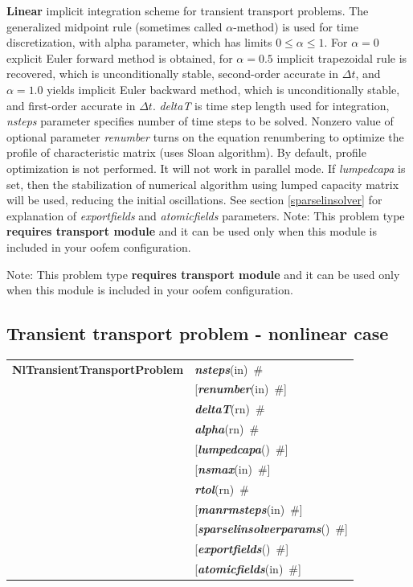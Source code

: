\documentclass[a4paper]{article}
\makeatletter
\newcommand{\param}[1]{{\em #1}}
\newcommand{\keywordnotype}[1]{\mbox{{\it{\bf{#1}}}}}
\newcommand{\keyword}[2]{\mbox{{\keywordnotype{#1}\tiny (#2)}}}
\newcommand{\entKeywordInst}[1]{\mbox{{\bf{{#1}}}}}
\newcommand{\field}[2]{\mbox{\keyword{#1}{#2}~\#}}
\newcommand{\optField}[2]{\mbox{[\field{#1}{#2}]}}
\newenvironment{record}[1][]{\begin{tabular}{|ll}}{\end{tabular}\\}
\newcommand{\recentry}[2]{{#1}&{#2}\\}
\newcounter{rcc}
\newenvironment{record}[1][\textwidth]{\setcounter{rcc}{0}\begin{tabular*}{#1}{|ll@{\extracolsep{\fill}}r}}{\end{tabular*}\\}
\newcommand{\recentry}[2]{\ifthenelse{\value{rcc}>0}{&$\backslash$ \\}{\setcounter{rcc}{1}}{#1}&{#2}}
\makeatother
\begin{document}
{\bf Linear} implicit
integration scheme for transient transport problems. The generalized
midpoint rule (sometimes called $\alpha$-method) is used for time discretization, with alpha parameter,
which has limits $0\le\alpha\le1$. For $\alpha=0$ explicit Euler
forward method is obtained, for $\alpha=0.5$ implicit trapezoidal rule
is recovered, which is unconditionally stable, second-order accurate
in $\Delta t$, and $\alpha=1.0$ yields implicit Euler backward method,
which is unconditionally stable, and first-order accurate
in $\Delta t$. \param{deltaT} is time step length used for
integration, \param{nsteps} parameter specifies
number of time steps to be solved.
Nonzero value of optional parameter \param{renumber} turns on the
equation renumbering to optimize the profile of characteristic matrix
(uses Sloan algorithm). By default, profile optimization is not
performed. It will not work in parallel mode.
If \param{lumpedcapa} is set, then the stabilization of numerical
algorithm using lumped capacity matrix will be used, reducing the
initial oscillations.
See section \ref{sparselinsolver} for explanation of
\param{exportfields} and \param{atomicfields} parameters.
Note: This problem type {\bf requires transport module} and it
can be used only when this module is included in your oofem
configuration.

Note: This problem type {\bf requires transport module} and it
can be used only when this module is included in your oofem
configuration.

\subsection{Transient transport problem - nonlinear case}
\label{TransientTransport}

\begin{record}
\recentry{\entKeywordInst{NlTransientTransportProblem}}{\field{nsteps}{in}}
\recentry{}{\optField{renumber}{in}}
\recentry{}{\field{deltaT}{rn}} \recentry{}{\field{alpha}{rn}} \recentry{}{\optField{lumpedcapa}{}}
\recentry{}{\optField{nsmax}{in}} \recentry{}{\field{rtol}{rn}} \recentry{}{\optField{manrmsteps}{in}}
\recentry{}{\optField{sparselinsolverparams}{}}
\recentry{}{\optField{exportfields}{}} \recentry{}{\optField{atomicfields}{in}}
\end{record}
\end{document}

